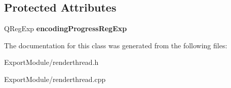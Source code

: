 \subsection*{\-Protected \-Attributes}
\begin{DoxyCompactItemize}
\item 
\hypertarget{class_render_thread_a4d6642cc1158cbebb1b809345820ad82}{
\-Q\-Reg\-Exp {\bfseries encoding\-Progress\-Reg\-Exp}}
\label{class_render_thread_a4d6642cc1158cbebb1b809345820ad82}

\end{DoxyCompactItemize}


\-The documentation for this class was generated from the following files\-:\begin{DoxyCompactItemize}
\item 
\-Export\-Module/renderthread.\-h\item 
\-Export\-Module/renderthread.\-cpp\end{DoxyCompactItemize}
